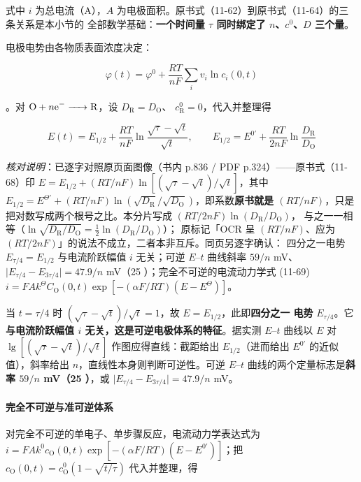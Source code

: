 式中 $i$ 为总电流（A），$A$ 为电极面积。原书式（11-62）到原书式（11-64）的三条关系是本小节的
全部数学基础：\textbf{一个时间量 $\tau$ 同时绑定了 $n$、$c^0$、$D$ 三个量}。

电极电势由各物质表面浓度决定：

\begin{equation}
\varphi(t)=\varphi^{0}+\frac{RT}{nF}\sum_i v_i\ln c_i(0,t)
\label{eq:chrono-phi}
\end{equation}

。对 $\ce{O + $n$e- -> R}$，设 $D_{\mathrm{R}}=D_{\mathrm{O}}$、
$c_{\mathrm{R}}^{0}=0$，代入并整理得

\begin{equation}
E(t)=E_{1/2}+\frac{RT}{nF}\ln\frac{\sqrt{\tau}-\sqrt{t}}{\sqrt{t}},
\qquad
E_{1/2}=E^{0'}+\frac{RT}{2nF}\ln\frac{D_{\mathrm{R}}}{D_{\mathrm{O}}}
\label{eq:chrono-erev}
\end{equation}

\emph{核对说明}：已逐字对照原页面图像（书内 p.836 / PDF p.324）——原书式（11-68）印
$E=E_{1/2}+(RT/nF)\ln[(\sqrt{\tau}-\sqrt{t})/\sqrt{t}]$，其中
$E_{1/2}=E^{\Theta'}+(RT/nF)\ln(\sqrt{D_{\mathrm{R}}}/\sqrt{D_{\mathrm{O}}})$，即系数\textbf{原书就是
$(RT/nF)$}，只是把对数写成两个根号之比。本分片写成 $(RT/2nF)\ln(D_{\mathrm{R}}/D_{\mathrm{O}})$，
与之一一相等（$\ln\sqrt{D_{\mathrm{R}}/D_{\mathrm{O}}}=\tfrac12\ln(D_{\mathrm{R}}/D_{\mathrm{O}})$）；
原标记「OCR 呈 $(RT/nF)$、应为 $(RT/2nF)$」的说法不成立，二者本非互斥。同页另逐字确认：
四分之一电势 $E_{\tau/4}=E_{1/2}$ 与电流阶跃幅值 $i$ 无关；可逆 $E$–$t$ 曲线斜率
$59/n$ mV、$\lvert E_{\tau/4}-E_{3\tau/4}\rvert=47.9/n$ mV（25 \degC）；完全不可逆的电流动力学式
(11-69) $i=FAk^{\Theta}C_{\mathrm{O}}(0,t)\exp[-(\alpha F/RT)(E-E^{\Theta})]$。

当 $t=\tau/4$ 时 $(\sqrt{\tau}-\sqrt{t})/\sqrt{t}=1$，故 $E=E_{1/2}$，此即\textbf{四分之一
电势} $E_{\tau/4}$。它\textbf{与电流阶跃幅值 $i$ 无关，这是可逆电极体系的特征}。据实测
$E$–$t$ 曲线以 $E$ 对 $\lg[(\sqrt{\tau}-\sqrt{t})/\sqrt{t}]$ 作图应得直线：截距给出
$E_{1/2}$（进而给出 $E^{0'}$ 的近似值），斜率给出 $n$，直线性本身则判断可逆性。可逆
$E$–$t$ 曲线的两个定量标志是\textbf{斜率 $59/n$ mV（25 \degC）}，或
$\lvert E_{\tau/4}-E_{3\tau/4}\rvert=47.9/n$ mV。

\paragraph{完全不可逆与准可逆体系} 对完全不可逆的单电子、单步骤反应，电流动力学表达式为
$i=FAk^{0}c_{\mathrm{O}}(0,t)\exp[-(\alpha F/RT)(E-E^{0'})]$；把
$c_{\mathrm{O}}(0,t)=c_{\mathrm{O}}^{0}(1-\sqrt{t/\tau})$ 代入并整理，得

